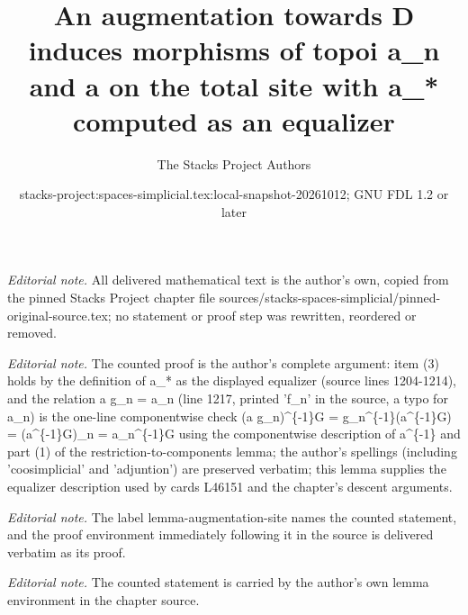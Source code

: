 \documentclass{stacks-project}
\title{An augmentation towards D induces morphisms of topoi a\_n and a on the total site with a\_* computed as an equalizer}
\author{The Stacks Project Authors}
\date{stacks-project:spaces-simplicial.tex:local-snapshot-20261012; GNU FDL 1.2 or later}
\theoremstyle{plain}
\theoremstyle{definition}
\theoremstyle{remark}
\numberwithin{equation}{subsection}
\begin{document}
\maketitle
\noindent\textit{Editorial note.} All delivered mathematical text is the author's own, copied from the pinned Stacks Project chapter file sources/stacks-spaces-simplicial/pinned-original-source.tex; no statement or proof step was rewritten, reordered or removed.\par\medskip
\noindent\textit{Editorial note.} The counted proof is the author's complete argument: item (3) holds by the definition of a\_* as the displayed equalizer (source lines 1204-1214), and the relation a g\_n = a\_n (line 1217, printed 'f\_n' in the source, a typo for a\_n) is the one-line componentwise check (a g\_n)\textasciicircum{}\{-1\}G = g\_n\textasciicircum{}\{-1\}(a\textasciicircum{}\{-1\}G) = (a\textasciicircum{}\{-1\}G)\_n = a\_n\textasciicircum{}\{-1\}G using the componentwise description of a\textasciicircum{}\{-1\} and part (1) of the restriction-to-components lemma; the author's spellings (including 'coosimplicial' and 'adjuntion') are preserved verbatim; this lemma supplies the equalizer description used by cards L46151 and the chapter's descent arguments.\par\medskip
\noindent\textit{Editorial note.} The label lemma-augmentation-site names the counted statement, and the proof environment immediately following it in the source is delivered verbatim as its proof.\par\medskip
\noindent\textit{Editorial note.} The counted statement is carried by the author's own lemma environment in the chapter source.\par\medskip
\end{document}
